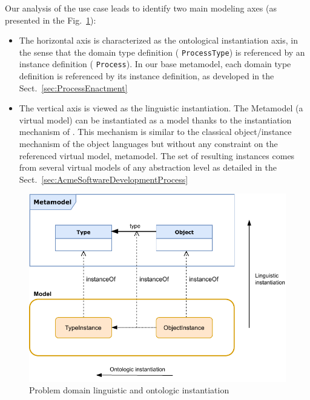 Our analysis of the use case leads to identify two main modeling axes (as presented in the Fig.~\ref{fig:LinguisticAndOntologicInstantiation}):
\begin{itemize}
    \item The horizontal axis is characterized as the ontological instantiation
      axis, in the sense that the domain type definition (\ie
      \texttt{ProcessType}) is referenced by an instance definition (\ie
      \texttt{Process}). In our base metamodel, each domain type definition is
      referenced by its instance definition, as developed in the Sect.~\ref{sec:ProcessEnactment}

\item The vertical axis is viewed as the linguistic instantiation. The
  Metamodel (a virtual model) can be instantiated as a model thanks to the
  instantiation mechanism of \FML. This mechanism is similar to the classical
  object/instance mechanism of the object languages but without any constraint
  on the referenced virtual model, \ie metamodel. The set of resulting
  instances comes from several virtual models of any abstraction level as
  detailed in the Sect.~\ref{sec:AcmeSoftwareDevelopmentProcess}



\end{itemize}

\begin{figure}
    \centering
    \includegraphics[width=1.0 \columnwidth]{Figures/Instantiation-1.5.pdf}
    \caption{Problem  domain linguistic and ontologic instantiation}
    \label{fig:LinguisticAndOntologicInstantiation}
\end{figure}

